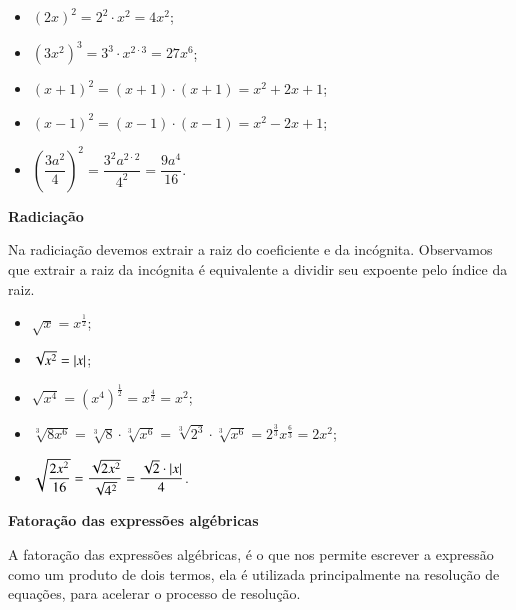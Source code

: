     \begin{itemize}
     \item $(2x)^2= 2^2 \cdot x^2= 4x^2$;
     \item $(3x^2)^3= 3^3 \cdot x^{2\cdot 3}= 27x^6$;
     \item $(x+1)^2= (x+1) \cdot (x+1)= x^2 + 2x +1$;
     \item $(x-1)^2= (x-1) \cdot (x-1)= x^2 - 2x +1$;
     \item $\left(\dfrac{3a^2}{4}\right)^2= \dfrac{3^2 a^{2 \cdot 2}}{4^2}= \dfrac{9a^4}{16}$.
    \end{itemize}

  \vskip0.3cm

  \textbf{Radiciação}

  Na radiciação devemos extrair a raiz do coeficiente e da incógnita. Observamos que extrair a raiz da incógnita é equivalente a dividir seu expoente pelo índice da raiz.
    \begin{itemize}
     \item $\sqrt{x}= x^{\frac{1}{2}}$;
     \item $\sqrt{x^2}= \left|x\right|$;
     \item $\sqrt{x^4}= (x^4)^{\frac{1}{2}}= x^{\frac{4}{2}}= x^2$;
     \item $\sqrt[3]{8x^6}= \sqrt[3]{8} \cdot \sqrt[3]{x^6}=\sqrt[3]{2^3} \cdot \sqrt[3]{x^6} = 2^{\frac{3}{3}} x^{\frac{6}{3}}= 2x^2$;
     \item $\sqrt{\dfrac{2x^2}{16}}= \dfrac{\sqrt{2x^2}}{\sqrt{4^2}}= \dfrac{\sqrt{2} \cdot \left|x\right|}{4}$.
     
    \end{itemize}

 \vskip0.3cm

  \textbf{Fatoração das expressões algébricas}

 \vskip0.3cm

 A fatoração das expressões algébricas, é o que nos permite escrever a expressão como um produto de dois termos, ela é utilizada principalmente na resolução de equações, para acelerar o processo de resolução.

